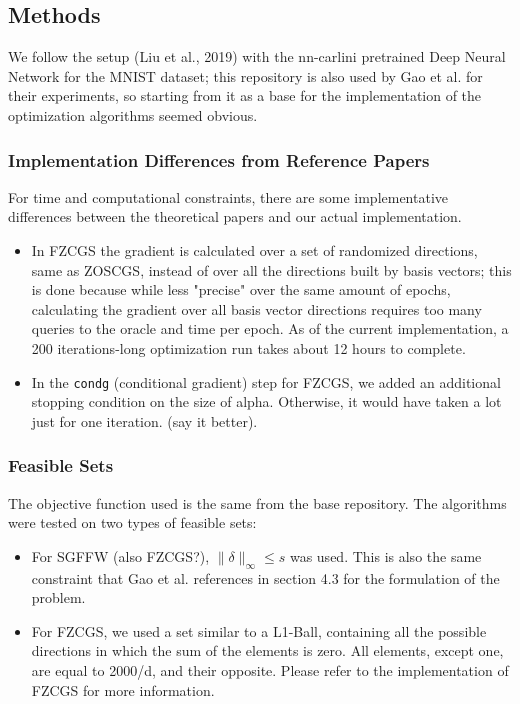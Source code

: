 \documentclass[10pt,twocolumn,letterpaper]{article}
\begin{document}
\subsection{Methods}

We follow the setup (Liu et al., 2019) with the nn-carlini pretrained Deep Neural Network for
the MNIST dataset; this repository is also used by Gao et al. for their experiments, so starting
from it as a base for the implementation of the optimization algorithms seemed obvious.

\subsubsection{Implementation Differences from Reference Papers}

For time and computational constraints, there are some implementative differences 
between the theoretical papers and our actual implementation.

\begin{itemize}
   \item In FZCGS the gradient is calculated over a set of 
   randomized directions, same as ZOSCGS, instead of over all 
   the directions built by basis vectors; this is done because 
   while less "precise" over the same amount of epochs, 
   calculating the gradient over all basis vector directions 
   requires too many queries to the oracle and time per epoch.
   As of the current implementation, a 200 iterations-long 
   optimization run takes about 12 hours to complete.

   \item In the \texttt{condg} (conditional gradient) step for FZCGS,
   we added an additional stopping condition on the size of alpha. Otherwise,
   it would have taken a lot just for one iteration. (say it better).
\end{itemize}

\subsubsection{Feasible Sets}

The objective function used is the same from the base repository.
The algorithms were tested on two types of feasible sets:

\begin{itemize}
   \item For SGFFW (also FZCGS?), $\|\delta\|_{\infty} \leq s$ was used. This is 
   also the same constraint that Gao et al. references in section 4.3 for the formulation
   of the problem.
   \item For FZCGS, we used a set similar to a L1-Ball,  containing
   all the possible directions in which the sum of the elements is zero. All elements, except
   one, are equal to 2000/d, and their opposite. Please refer to the implementation of FZCGS for more information. 
\end{itemize}
\end{document}
